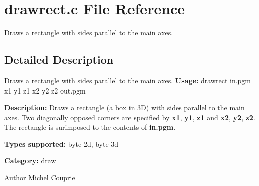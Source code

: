 \section{drawrect.c File Reference}
\label{drawrect_8c}


Draws a rectangle with sides parallel to the main axes.  




\subsection{Detailed Description}
Draws a rectangle with sides parallel to the main axes. {\bfseries Usage:} drawrect in.pgm x1 y1 z1 x2 y2 z2 out.pgm

{\bfseries Description:} Draws a rectangle (a box in 3D) with sides parallel to the main axes. Two diagonally opposed corners are specified by {\bfseries x1}, {\bfseries y1}, {\bfseries z1} and {\bfseries x2}, {\bfseries y2}, {\bfseries z2}. The rectangle is surimposed to the contents of {\bfseries in.pgm}.

{\bfseries Types supported:} byte 2d, byte 3d

{\bfseries Category:} draw

\begin{DoxyAuthor}{Author}
Michel Couprie 
\end{DoxyAuthor}
